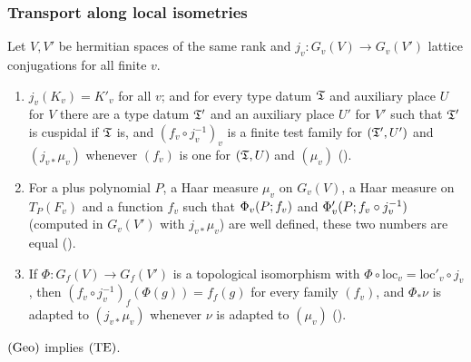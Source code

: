 \subsubsection*{Transport along local isometries}

\begin{lemma}\label{pf:multnc:transport}
Let $V,V'$ be hermitian spaces of the same rank and $j_v\colon G_v(V)\to G_v(V')$ lattice conjugations for all finite $v$.
\begin{enumerate}[label=(\alph*)]
\item $j_v(K_v)=K'_v$ for all $v$; and for every type datum $\mathfrak{T}$ and auxiliary place $U$ for $V$ there are a type
datum $\mathfrak{T}'$ and an auxiliary place $U'$ for $V'$ such that $\mathfrak{T}'$ is cuspidal if $\mathfrak{T}$ is, and
$(f_v\circ j_v^{-1})_v$ is a finite test family for $(\mathfrak{T}',U')$ and $(j_{v*}\mu_v)$ whenever $(f_v)$ is one for
$(\mathfrak{T},U)$ and $(\mu_v)$ ().
\item For a plus polynomial $P$, a Haar measure $\mu_v$ on $G_v(V)$, a Haar measure on $T_P(F_v)$ and a function $f_v$ such
that $\Phi_v(P;f_v)$ and $\Phi'_v(P;f_v\circ j_v^{-1})$ (computed in $G_v(V')$ with $j_{v*}\mu_v$) are well
defined, these two numbers are equal ().
\item If $\Phi\colon G_f(V)\to G_f(V')$ is a topological isomorphism with $\Phi\circ\mathrm{loc}_v=\mathrm{loc}'_v\circ j_v$,
then $(f_v\circ j_v^{-1})_f(\Phi(g))=f_f(g)$ for every family $(f_v)$, and $\Phi_*\nu$ is adapted to $(j_{v*}\mu_v)$ whenever
$\nu$ is adapted to $(\mu_v)$ ().
\end{enumerate}
\end{lemma}

\begin{proposition}\label{pf:multnc:traceeq}
$\textup{(Geo)}$ implies $\textup{(TE)}$.
\end{proposition}

